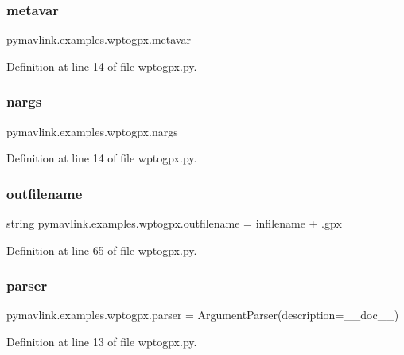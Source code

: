 \subsubsection{\texorpdfstring{metavar}{metavar}}
{\footnotesize\ttfamily pymavlink.\+examples.\+wptogpx.\+metavar}



Definition at line 14 of file wptogpx.\+py.

\mbox{\label{namespacepymavlink_1_1examples_1_1wptogpx_a18e53d182196efcc641b9a08e31e5515}} 
\subsubsection{\texorpdfstring{nargs}{nargs}}
{\footnotesize\ttfamily pymavlink.\+examples.\+wptogpx.\+nargs}



Definition at line 14 of file wptogpx.\+py.

\mbox{\label{namespacepymavlink_1_1examples_1_1wptogpx_a88358ed94e434e7d6a7b835f2c5ccf70}} 
\subsubsection{\texorpdfstring{outfilename}{outfilename}}
{\footnotesize\ttfamily string pymavlink.\+examples.\+wptogpx.\+outfilename = infilename + \textquotesingle{}.gpx\textquotesingle{}}



Definition at line 65 of file wptogpx.\+py.

\mbox{\label{namespacepymavlink_1_1examples_1_1wptogpx_aa1800996bbadaa4ce742a88d9c7b9c38}} 
\subsubsection{\texorpdfstring{parser}{parser}}
{\footnotesize\ttfamily pymavlink.\+examples.\+wptogpx.\+parser = Argument\+Parser(description=\+\_\+\+\_\+doc\+\_\+\+\_\+)}



Definition at line 13 of file wptogpx.\+py.

